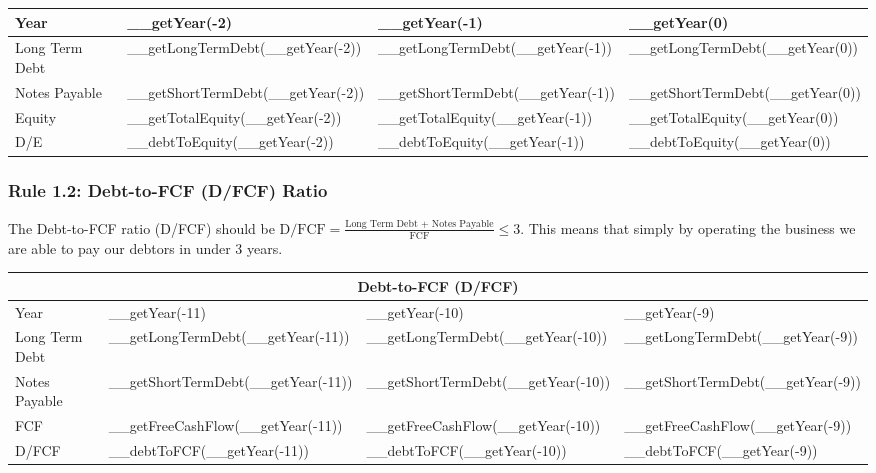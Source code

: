 \begin{tabularx}{\textwidth}{|X|X|X|X|}
 \hline
 Year                       & __getYear(-2)                        & __getYear(-1)                        & __getYear(0)                     \\
 \hline
 Long Term Debt             & __getLongTermDebt(__getYear(-2))     & __getLongTermDebt(__getYear(-1))     & __getLongTermDebt(__getYear(0))  \\
 Notes Payable              & __getShortTermDebt(__getYear(-2))    & __getShortTermDebt(__getYear(-1))    & __getShortTermDebt(__getYear(0)) \\
 Equity                     & __getTotalEquity(__getYear(-2))      & __getTotalEquity(__getYear(-1))      & __getTotalEquity(__getYear(0))   \\
 \rowcolor{lightgray} D/E   & __debtToEquity(__getYear(-2))        & __debtToEquity(__getYear(-1))        & __debtToEquity(__getYear(0))     \\
 \hline
\end{tabularx}

\subsubsection{{Rule 1.2: Debt-to-FCF (D/FCF) Ratio}}

The Debt-to-FCF ratio (D/FCF) should be $\text{D/FCF} = \frac{\text{Long Term Debt + Notes Payable}}{\text{FCF}} \leq 3$.
This means that simply by operating the business we are able to pay our debtors
in under 3 years.\\

\begin{tabularx}{\textwidth}{|X|X|X|X|}
 \hline
 \multicolumn{4}{|c|}{Debt-to-FCF (D/FCF)} \\
 \hline
 Year                       & __getYear(-11)                           & __getYear(-10)                           & __getYear(-9)                     \\
 \hline
 Long Term Debt             & __getLongTermDebt(__getYear(-11))        & __getLongTermDebt(__getYear(-10))        & __getLongTermDebt(__getYear(-9))  \\
 Notes Payable              & __getShortTermDebt(__getYear(-11))       & __getShortTermDebt(__getYear(-10))       & __getShortTermDebt(__getYear(-9)) \\
 FCF                        & __getFreeCashFlow(__getYear(-11))        & __getFreeCashFlow(__getYear(-10))        & __getFreeCashFlow(__getYear(-9))  \\
 \rowcolor{lightgray} D/FCF & __debtToFCF(__getYear(-11))              & __debtToFCF(__getYear(-10))              & __debtToFCF(__getYear(-9))        \\
 \hline
\end{tabularx}\\

